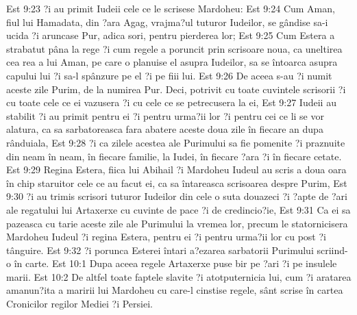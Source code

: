 Est 9:23  ?i au primit Iudeii cele ce le scrisese Mardoheu:
Est 9:24  Cum Aman, fiul lui Hamadata, din ?ara Agag, vrajma?ul tuturor Iudeilor, se gândise sa-i ucida ?i aruncase Pur, adica sori, pentru pierderea lor;
Est 9:25  Cum Estera a strabatut pâna la rege ?i cum regele a poruncit prin scrisoare noua, ca uneltirea cea rea a lui Aman, pe care o planuise el asupra Iudeilor, sa se întoarca asupra capului lui ?i sa-l spânzure pe el ?i pe fiii lui.
Est 9:26  De aceea s-au ?i numit aceste zile Purim, de la numirea Pur. Deci, potrivit cu toate cuvintele scrisorii ?i cu toate cele ce ei vazusera ?i cu cele ce se petrecusera la ei,
Est 9:27  Iudeii au stabilit ?i au primit pentru ei ?i pentru urma?ii lor ?i pentru cei ce li se vor alatura, ca sa sarbatoreasca fara abatere aceste doua zile în fiecare an dupa rânduiala,
Est 9:28  ?i ca zilele acestea ale Purimului sa fie pomenite ?i praznuite din neam în neam, în fiecare familie, la Iudei, în fiecare ?ara ?i în fiecare cetate.
Est 9:29  Regina Estera, fiica lui Abihail ?i Mardoheu Iudeul au scris a doua oara în chip staruitor cele ce au facut ei, ca sa întareasca scrisoarea despre Purim,
Est 9:30  ?i au trimis scrisori tuturor Iudeilor din cele o suta douazeci ?i ?apte de ?ari ale regatului lui Artaxerxe cu cuvinte de pace ?i de credincio?ie,
Est 9:31  Ca ei sa pazeasca cu tarie aceste zile ale Purimului la vremea lor, precum le statornicisera Mardoheu Iudeul ?i regina Estera, pentru ei ?i pentru urma?ii lor cu post ?i tânguire.
Est 9:32  ?i porunca Esterei întari a?ezarea sarbatorii Purimului scriind-o în carte.
Est 10:1  Dupa aceea regele Artaxerxe puse bir pe ?ari ?i pe insulele marii.
Est 10:2  De altfel toate faptele slavite ?i atotputernicia lui, cum ?i aratarea amanun?ita a maririi lui Mardoheu cu care-l cinstise regele, sânt scrise în cartea Cronicilor regilor Mediei ?i Persiei.
